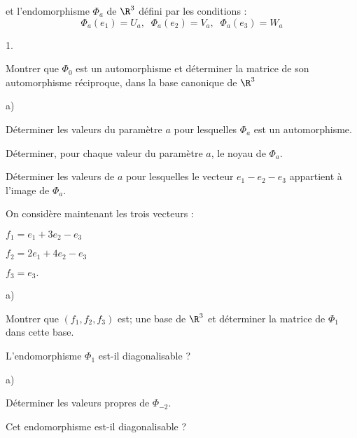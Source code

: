 \documentclass[11pt]{article}%
\begin{document}
et l'endomorphisme $\Phi_{a}$ de $\R^{3}$ défini par les conditions : 
\[
\Phi_{a}\left( e_{1}\right) = U_{a},\;\;\Phi_{a}\left( e_{2}\right)
 = V_{a},\;\;\Phi_{a}\left( e_{3}\right) = W_{a}
\]

\begin{noliste}{1.}
 \setlength{\itemsep}{4mm}
\item Montrer que $\Phi_{0}$ est un automorphisme et déterminer la
matrice
de son automorphisme réciproque, dans la base canonique de $\R^{3}$

\item 

\begin{noliste}{a)}
 \setlength{\itemsep}{2mm}
\item Déterminer les valeurs du paramètre $a$ pour lesquelles
$\Phi_{a}$
est un automorphisme.

\item Déterminer, pour chaque valeur du paramètre $a$, le noyau de
$\Phi
_{a} $.

\item Déterminer les valeurs de $a$ pour lesquelles le vecteur
$e_{1}-e_{2}-e_{3}$ appartient à l'image de $\Phi_{a}$.
\end{noliste}

\item On considère maintenant les trois vecteurs :

$f_{1} = e_{1} + 3e_{2}-e_{3}$

$f_{2} = 2e_{1} + 4e_{2}-e_{3}$

$f_{3} = e_{3}.$

\begin{noliste}{a)}
 \setlength{\itemsep}{2mm}
\item Montrer que $\left( f_{1},f_{2},f_{3}\right) $ est; une base de
$\R^{3}$ et déterminer la matrice de $\Phi_{1}$ dans cette base.

\item L'endomorphisme $\Phi_{1}$ est-il diagonalisable ?
\end{noliste}

\item 

\begin{noliste}{a)}
 \setlength{\itemsep}{2mm}
\item Déterminer les valeurs propres de $\Phi_{-2}$.

\item Cet endomorphisme est-il diagonalisable ?
\end{noliste}
\end{noliste}
\end{document}
